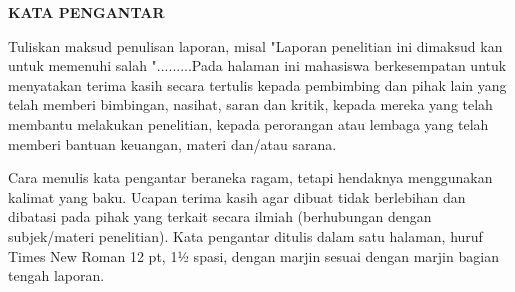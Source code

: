 \cleardoublepage
\centerline{\large\bfseries KATA PENGANTAR}
{}
\vspace*{40pt}

Tuliskan maksud penulisan laporan, misal "Laporan penelitian ini dimaksud kan untuk memenuhi salah ".........Pada halaman ini mahasiswa berkesempatan untuk menyatakan terima kasih secara tertulis kepada pembimbing dan pihak lain yang telah memberi bimbingan, nasihat, saran dan kritik, kepada mereka yang telah membantu melakukan penelitian, kepada perorangan atau lembaga yang telah memberi bantuan keuangan, materi dan/atau sarana.

Cara menulis kata pengantar beraneka ragam, tetapi hendaknya menggunakan kalimat yang baku. Ucapan terima kasih agar dibuat tidak berlebihan dan dibatasi pada pihak yang terkait secara ilmiah (berhubungan dengan subjek/materi penelitian). Kata pengantar ditulis dalam satu halaman, huruf Times New Roman 12 pt, 1½ spasi, dengan marjin sesuai dengan marjin bagian tengah laporan.